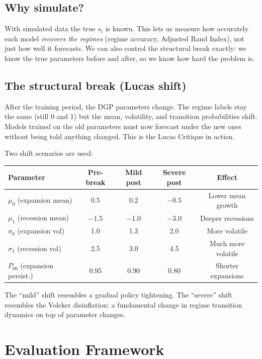 \documentclass[11pt, a4paper]{article}
\begin{document}
\subsection{Why simulate?}

With simulated data the true $s_t$ is known. This lets us measure how accurately
each model \emph{recovers the regimes} (regime accuracy, Adjusted Rand Index),
not just how well it forecasts. We can also control the structural break exactly:
we know the true parameters before and after, so we know how hard the problem is.

\subsection{The structural break (Lucas shift)}

After the training period, the DGP parameters change. The regime labels stay the
same (still 0 and 1) but the mean, volatility, and transition probabilities shift.
Models trained on the old parameters must now forecast under the new ones without
being told anything changed. This is the Lucas Critique in action.

Two shift scenarios are used:

\begin{center}
\begin{tabular}{lcccc}
  \toprule
  Parameter & Pre-break & Mild post & Severe post & Effect \\
  \midrule
  $\mu_0$ (expansion mean) & 0.5 & 0.2 & $-$0.5 & Lower mean growth \\
  $\mu_1$ (recession mean) & $-$1.5 & $-$1.0 & $-$3.0 & Deeper recessions \\
  $\sigma_0$ (expansion vol) & 1.0 & 1.3 & 2.0 & More volatile \\
  $\sigma_1$ (recession vol) & 2.5 & 3.0 & 4.5 & Much more volatile \\
  $P_{00}$ (expansion persist.) & 0.95 & 0.90 & 0.80 & Shorter expansions \\
  \bottomrule
\end{tabular}
\end{center}

The ``mild'' shift resembles a gradual policy tightening. The ``severe'' shift
resembles the Volcker disinflation: a fundamental change in regime transition
dynamics on top of parameter changes.

\section{Evaluation Framework}
\end{document}

